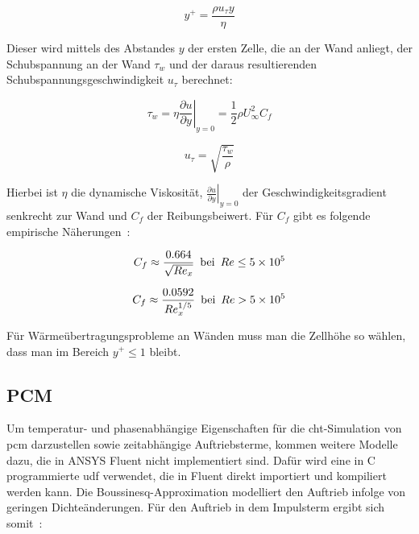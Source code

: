 \begin{equation}
  \label{eq:yplus}
  y^+ = \frac{\rho u_{\tau} y}{\eta}
\end{equation}

Dieser wird mittels des Abstandes $y$ der ersten Zelle, die an der Wand anliegt, der Schubspannung an der Wand $\tau_w$ und der daraus resultierenden Schubspannungsgeschwindigkeit $u_{\tau}$ berechnet:

\noindent\begin{minipage}{.5\linewidth}
  \begin{equation}
    \label{eq:schubspannung}
    \tau_w = \eta \left.\frac{\partial u}{\partial y}\right|_{y=0} = \frac{1}{2} \rho U_{\infty}^{2} C_f
  \end{equation}
\end{minipage}%
\begin{minipage}{.5\linewidth}
  \begin{equation}
    \label{eq:schubspannung_geschwindigkeit}
    u_{\tau} = \sqrt{\frac{\tau_w}{\rho}}
  \end{equation}
\end{minipage}

Hierbei ist $\eta$ die dynamische Viskosität, $\left.\frac{\partial u}{\partial y}\right|_{y=0}$ der Geschwindigkeitsgradient senkrecht zur Wand
und $C_f$ der Reibungsbeiwert.
Für $C_f$ gibt es folgende empirische Näherungen~\cite{Anderson-2017}:

\begin{equation}
    \label{eq:reibungsbeiwert_laminar}
    C_f \approx \frac{0.664}{\sqrt{{Re}_x}} \hspace{0.5em} \mathrm{bei} \hspace{0.5em} Re \leq \SI{5e5}{}
\end{equation}

\begin{equation}
    \label{eq:reibungsbeiwert_turbulent}
    C_f \approx \frac{0.0592}{{Re}_x^{1/5}} \hspace{0.5em} \mathrm{bei} \hspace{0.5em} Re > \SI{5e5}{}
\end{equation}

Für Wärmeübertragungsprobleme an Wänden muss man die Zellhöhe so wählen, dass man im Bereich $y^+ \leq 1$ bleibt.

\subsection{PCM}
Um temperatur- und phasenabhängige Eigenschaften für die \ac{cht}-Simulation von \ac{pcm} darzustellen sowie zeitabhängige Auftriebsterme, kommen weitere Modelle dazu,
die in ANSYS Fluent nicht implementiert sind. Dafür wird eine in C programmierte \ac{udf} verwendet, die in Fluent direkt importiert
und kompiliert werden kann.
Die Boussinesq-Approximation modelliert den Auftrieb infolge von geringen Dichteänderungen. Für den Auftrieb
in dem Impulsterm ergibt sich somit~\cite{akamcae-udf}:

